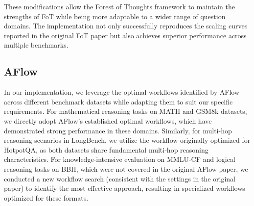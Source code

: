 These modifications allow the Forest of Thoughts framework to maintain the strengths of FoT while being more adaptable to a wider range of question domains. The implementation not only successfully reproduces the scaling curves reported in the original FoT paper but also achieves superior performance across multiple benchmarks.

\subsection{AFlow}
In our implementation, we leverage the optimal workflows identified by AFlow across different benchmark datasets while adapting them to suit our specific requirements. For mathematical reasoning tasks on MATH and GSM8k datasets, we directly adopt AFlow's established optimal workflows, which have demonstrated strong performance in these domains. Similarly, for multi-hop reasoning scenarios in LongBench, we utilize the workflow originally optimized for HotpotQA, as both datasets share fundamental multi-hop reasoning characteristics.
For knowledge-intensive evaluation on MMLU-CF and logical reasoning tasks on BBH, which were not covered in the original AFlow paper, we conducted a new workflow search (consistent with the settings in the original paper) to identify the most effective approach, resulting in specialized workflows optimized for these formats. 
